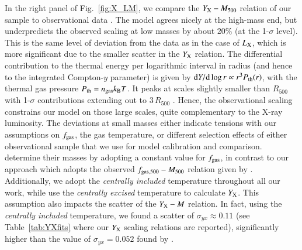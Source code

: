 \documentclass[useAMS,usenatbib]{mn2e}
\newcommand{\dd}{\mathrm{d}}
\begin{document}
In the right panel of Fig.~\ref{fig:X_LM}, we compare the $Y_{{\mathrm{X}}}-M_{500}$
relation of our sample to observational data \citep{2010MNRAS.406.1773M}. The
model agrees nicely at the high-mass end, but underpredicts the observed scaling
at low masses by about $20\%$ (at the 1-$\sigma$ level). This is the same level
of deviation from the data as in the case of $L_{{\mathrm{X}}}$, which is more
significant due to the smaller scatter in the $Y_{{\mathrm{X}}}$ relation. The
differential contribution to the thermal energy per logarithmic interval in
radius (and hence to the integrated Compton-$y$ parameter) is given by $\dd Y
/\dd\log r \propto r^3 P_{\rmn{th}}(r)$, with the thermal gas pressure
$P_{{\mathrm{th}}}=n_{{\mathrm{gas}}}k_{{\mathrm{B}}}T$. It peaks at scales slightly smaller
than $R_{500}$ with 1-$\sigma$ contributions extending out to $3\,R_{500}$
\citep{2010ApJ...725...91B}. Hence, the observational scaling constrains our
model on those large scales, quite complementary to the X-ray luminosity. The
deviations at small masses either indicate tensions with our assumptions on
$f_{{\mathrm{gas}}}$, the gas temperature, or different selection effects of either
observational sample that we use for model calibration and comparison.
\cite{2010MNRAS.406.1773M} determine their masses by adopting a constant value
for $f_{{\mathrm{gas}}}$, in contrast to our approach which adopts the observed
$f_{{\mathrm{gas}},500}-M_{500}$ relation given by
\cite{2009ApJ...693.1142S}. Additionally, we adopt the
\cite{2010MNRAS.406.1773M} \emph{centrally included} temperature throughout all
our work, while \cite{2010MNRAS.406.1773M} use the \emph{centrally excised}
temperature to calculate $Y_{{\mathrm{X}}}$. This assumption also impacts the scatter
of the $Y_{{\mathrm{X}}}-M$ relation. In fact, using the \emph{centrally included}
temperature, we found a scatter of $\sigma_{yx} \approx 0.11$ (see
Table~\ref{tab:YXfits} where our $Y_{{\mathrm{X}}}$ scaling relations are reported),
significantly higher than the value of $\sigma_{yx} = 0.052$ found by
\cite{2010MNRAS.406.1773M}.
\end{document}

